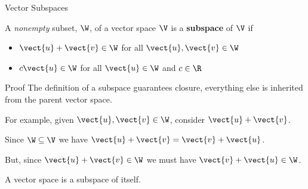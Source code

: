\documentclass{beamer}
\begin{document}
\begin{frame}{Vector Subspaces}
\begin{theorem}
A \emph{nonempty} subset, $\W$, of a vector space $\V$ is a \textbf{subspace} of $\V$ if
\begin{itemize}
\item $\vect{u}+\vect{v}\in\W$ for all $\vect{u},\vect{v}\in\W$
\item $c\vect{u}\in\W$ for all $\vect{u}\in\W$ and $c\in\R$
\end{itemize}
\end{theorem}\pause
\begin{block}{Proof}
The definition of a subspace guarantees closure, everything else is inherited from the parent vector space.

\vspace{0.25cm}
For example, given $\vect{u},\vect{v}\in\W$, consider $\vect{u}+\vect{v}$.\pause

Since $\W\subseteq\V$ we have $\vect{u}+\vect{v}=\vect{v}+\vect{u}$.\pause

But, since $\vect{u}+\vect{v}\in\W$ we must have $\vect{v}+\vect{u}\in\W$.
\end{block}\pause
\begin{block}{}
A vector space is a subspace of itself.
\end{block}
\end{frame}
\end{document}
